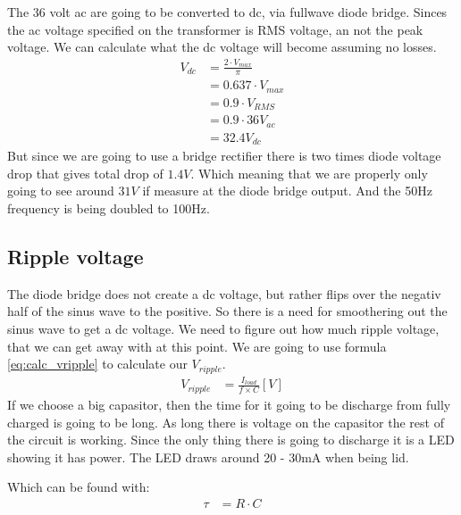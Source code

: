 The 36 volt ac are going to be converted to dc, via fullwave diode bridge. Sinces the ac voltage specified on the transformer is RMS voltage, an not the peak voltage. We can calculate what the dc voltage will become assuming no losses.
\begin{align} \label{eq:calc_vdc}
V_{ dc } &= \frac{ 2 \cdot V_{ max } }{ \pi } \\
         &= 0.637 \cdot V_{ max } \\
         &= 0.9 \cdot V_{ RMS } \\
         &= 0.9 \cdot 36 V_{ac} \nonumber \\
         &= 32.4 V_{ dc } \nonumber
\end{align}
But since we are going to use a bridge rectifier there is two times diode voltage drop that gives total drop of \(1.4V\). Which meaning that we are properly only going to see around \( 31V \) if measure at the diode bridge output. And the 50Hz frequency is being doubled to 100Hz.

\subsection{Ripple voltage}
The diode bridge does not create a dc voltage, but rather flips over the negativ half of the sinus wave to the positive. So there is a need for smoothering out the sinus wave to get a dc voltage. 
We need to figure out how much ripple voltage, that we can get away with at this point. We are going to use formula \ref{eq:calc_vripple} to calculate our $V_{ripple}$.
\begin{align}\label{eq:calc_vripple}
V_{ ripple } &= \frac{ I_{ load } }{ f \times C } [V]
\end{align}
If we choose a big capasitor, then the time for it going to be discharge from fully charged is going to be long. As long there is voltage on the capasitor the rest of the circuit is working. Since the only thing there is going to discharge it is a LED showing it has power. The LED draws around 20 - 30mA when being lid.

Which can be found with:
\begin{align}
\tau &= R \cdot C
\end{align}

